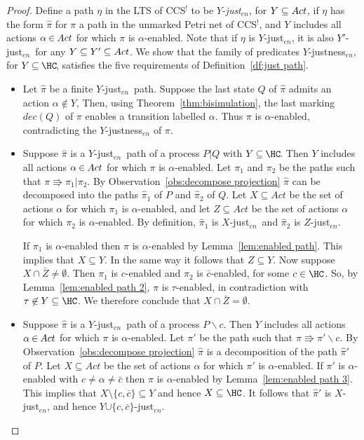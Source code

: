 \documentclass[smallcondensed]{svjour3}
\newcommand{\Thm}[1]{Theorem~\ref{thm:#1}}
\newcommand{\Lem}[1]{Lemma~\ref{lem:#1}}
\newcommand{\Def}[1]{Definition~\ref{df:#1}}
\begin{document}
\newcommand{\ejustn}{just${}_{en}$}
\newcommand{\ejust}{just${}_{en}$\ }
\newcommand{\Obs}[1]{Observation~\ref{obs:#1}}
\begin{proof}
  Define a path $\eta$ in the LTS of CCS$^!$ to be $Y\!$-\emph{\ejustn}, for $Y\subseteq Act$,
  if $\eta$ has the form $\widehat\pi$ for $\pi$ a path in the unmarked Petri net of CCS$^!$, and
  $Y$ includes all actions $\alpha\mathbin\in Act$ for which $\pi$ is $\alpha$-enabled.
  Note that if $\eta$ is $Y\!$-\ejustn, it is also $Y'\!$-\ejust for any $Y\subseteq Y'\subseteq Act$.
  We show that the family of predicates $Y\!$-justness${}_{en}$, for $Y\mathbin\subseteq \HC\!$,
  satisfies the five requirements of \Def{just path}.
  
  \begin{itemize}
  \item Let $\widehat \pi$ be a finite $Y\!$-\ejust path. Suppose the last state $Q$ of $\widehat\pi$ admits an action $\alpha\notin Y$,
  Then, using \Thm{bisimulation}, the last marking $dec(Q)$ of $\pi$ enables a
  transition labelled $\alpha$. Thus $\pi$ is $\alpha$-enabled, contradicting the $Y\!$-justness${}_{en}$ of $\pi$.

  \item Suppose $\widehat\pi$ is a $Y\!$-\ejust path of a process $P|Q$ {with $Y\mathbin\subseteq \HC\!$}.
  Then $Y$ includes all actions $\alpha\mathbin\in Act$ for which $\pi$ is $\alpha$-enabled.
  Let $\pi_1$ and $\pi_2$ be the paths such that $\pi\Rrightarrow \pi_1|\pi_2$.
  By \Obs{decompose projection} $\widehat \pi$ can be decomposed into the paths $\widehat\pi_1$ of $P$ and $\widehat\pi_2$ of $Q$.
  Let $X \subseteq Act$ be the set of actions $\alpha$ for which $\pi_1$ is $\alpha$-enabled,
  and let $Z \subseteq Act$ be the set of actions $\alpha$ for which $\pi_2$ is $\alpha$-enabled.
  By definition, $\widehat\pi_1$ is $X$-\ejust and $\widehat\pi_2$ is $Z$-\ejustn. 
  
  If $\pi_1$ is $\alpha$-enabled then $\pi$ is $\alpha$-enabled by \Lem{enabled path}.
  This implies that $X\subseteq Y$.
  In the same way it follows that $Z\subseteq Y$.
  Now suppose $X\cap \bar{Z} \neq\emptyset$.
  Then $\pi_1$ is $c$-enabled and $\pi_2$ is $\bar c$-enabled, for some $c\in\HC$.
  So, by \Lem{enabled path 2}, $\pi$ is $\tau$-enabled, in contradiction with $\tau\not\in Y\subseteq \HC$.
  We therefore conclude that $X\cap \bar{Z} = \emptyset$.

  \item Suppose $\widehat\pi$ is a $Y\!$-\ejust path of a process $P\backslash c$.
  Then $Y$ includes all actions $\alpha\mathbin\in Act$ for which $\pi$ is $\alpha$-enabled.
  Let $\pi'$ be the path such that $\pi\Rrightarrow \pi'\backslash c$.
  By \Obs{decompose projection} $\widehat \pi$ is a decomposition of the path $\widehat\pi'$ of $P$.
  Let $X \subseteq Act$ be the set of actions $\alpha$ for which $\pi'$ is $\alpha$-enabled.
  If $\pi'$ is $\alpha$-enabled with $c\neq\alpha\neq \bar c$ then $\pi$ is $\alpha$-enabled by \Lem{enabled path 3}.
  This implies that $X\setminus\{c,\bar c\} \subseteq Y$ and hence $X\subseteq \HC$.
  It follows that $\widehat\pi'$ is $X$-\ejustn, and hence $Y\mathord\cup\{c,\bar c\}$-\ejustn.


\end{itemize}
\end{proof}
\end{document}
